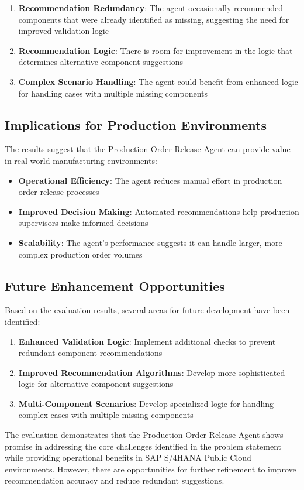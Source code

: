 \begin{enumerate}
    \item \textbf{Recommendation Redundancy}: The agent occasionally recommended components that were already identified as missing, suggesting the need for improved validation logic
    \item \textbf{Recommendation Logic}: There is room for improvement in the logic that determines alternative component suggestions
    \item \textbf{Complex Scenario Handling}: The agent could benefit from enhanced logic for handling cases with multiple missing components
\end{enumerate}

\subsection{Implications for Production Environments}

The results suggest that the Production Order Release Agent can provide value in real-world manufacturing environments:

\begin{itemize}
    \item \textbf{Operational Efficiency}: The agent reduces manual effort in production order release processes
    \item \textbf{Improved Decision Making}: Automated recommendations help production supervisors make informed decisions
    \item \textbf{Scalability}: The agent's performance suggests it can handle larger, more complex production order volumes
\end{itemize}

\subsection{Future Enhancement Opportunities}

Based on the evaluation results, several areas for future development have been identified:

\begin{enumerate}
    \item \textbf{Enhanced Validation Logic}: Implement additional checks to prevent redundant component recommendations
    \item \textbf{Improved Recommendation Algorithms}: Develop more sophisticated logic for alternative component suggestions
    \item \textbf{Multi-Component Scenarios}: Develop specialized logic for handling complex cases with multiple missing components
\end{enumerate}

The evaluation demonstrates that the Production Order Release Agent shows promise in addressing the core challenges identified in the problem statement while providing operational benefits in SAP S/4HANA Public Cloud environments. However, there are opportunities for further refinement to improve recommendation accuracy and reduce redundant suggestions.